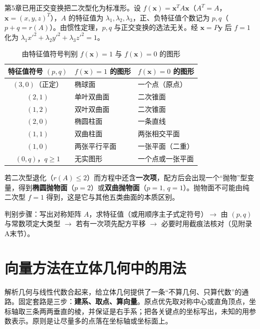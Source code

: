 第5章已用正交变换把二次型化为标准形。设 $f(\boldsymbol{x})=\boldsymbol{x}^{T}A\boldsymbol{x}$（$A^{T}=A$，$\boldsymbol{x}=(x,y,z)^{T}$），$A$ 的特征值为 $\lambda_1,\lambda_2,\lambda_3$，正、负特征值个数记为 $p,q$（$p+q=r(A)$）。由惯性定理，$p,q$ 与正交变换的选法无关。经 $\boldsymbol{x}=P\boldsymbol{y}$ 后 $f=1$ 化为 $\lambda_1x'^{2}+\lambda_2y'^{2}+\lambda_3z'^{2}=1$。

\begin{table}[htbp]
\centering
\renewcommand{\tablename}{表}
\caption{由特征值符号判别 $f(\boldsymbol{x})=1$ 与 $f(\boldsymbol{x})=0$ 的图形}
\begin{tabular}{@{}cll@{}}
\toprule
特征值符号 $(p,q)$ & $f(\boldsymbol{x})=1$ 的图形 & $f(\boldsymbol{x})=0$ 的图形 \\
\midrule
$(3,0)$（正定） & 椭球面 & 一个点（原点） \\
$(2,1)$ & 单叶双曲面 & 二次锥面 \\
$(1,2)$ & 双叶双曲面 & 二次锥面 \\
$(2,0)$ & 椭圆柱面 & 一条直线 \\
$(1,1)$ & 双曲柱面 & 两张相交平面 \\
$(1,0)$ & 两张平行平面 & 一张平面（二重） \\
$(0,q)$，$q\ge1$ & 无实图形 & 一个点或一张平面 \\
\bottomrule
\end{tabular}
\end{table}

若二次型退化（$r(A)\le2$）而方程中还含\textbf{一次项}，配方后会出现一个“抛物”型变量，得到\textbf{椭圆抛物面}（$p=2$）或\textbf{双曲抛物面}（$p=1,\,q=1$）。抛物面不可能由纯二次型 $f=1$ 得到，这是它与其他五类曲面的本质区别。

判别步骤：写出对称矩阵 $A$，求特征值（或用顺序主子式定符号）$\rightarrow$ 由 $(p,q)$ 与常数项定大类型 $\rightarrow$ 若有一次项先配方平移 $\rightarrow$ 必要时用截痕法核对（见附录A末节）。


\section{向量方法在立体几何中的用法}

解析几何与线性代数合起来，给立体几何提供了一条“不算几何、只算代数”的通路。固定套路是三步：\textbf{建系、取点、算向量}。原点优先取对称中心或直角顶点，坐标轴取三条两两垂直的棱，并保证是右手系；把各关键点的坐标写出，未知的用参数表示。原则是让尽量多的点落在坐标轴或坐标面上。


